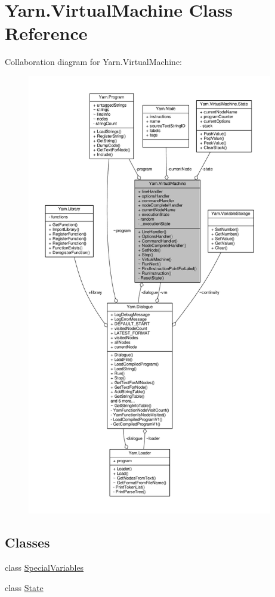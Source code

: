 \hypertarget{a00136}{\section{Yarn.\-Virtual\-Machine Class Reference}
\label{a00136}
}


Collaboration diagram for Yarn.\-Virtual\-Machine\-:
\nopagebreak
\begin{figure}[H]
\begin{center}
\leavevmode
\includegraphics[height=550pt]{d4/d10/a00635}
\end{center}
\end{figure}
\subsection*{Classes}
\begin{DoxyCompactItemize}
\item 
class \hyperlink{a00136_de/dab/a00319}{Special\-Variables}
\item 
class \hyperlink{a00139}{State}
\end{DoxyCompactItemize}

